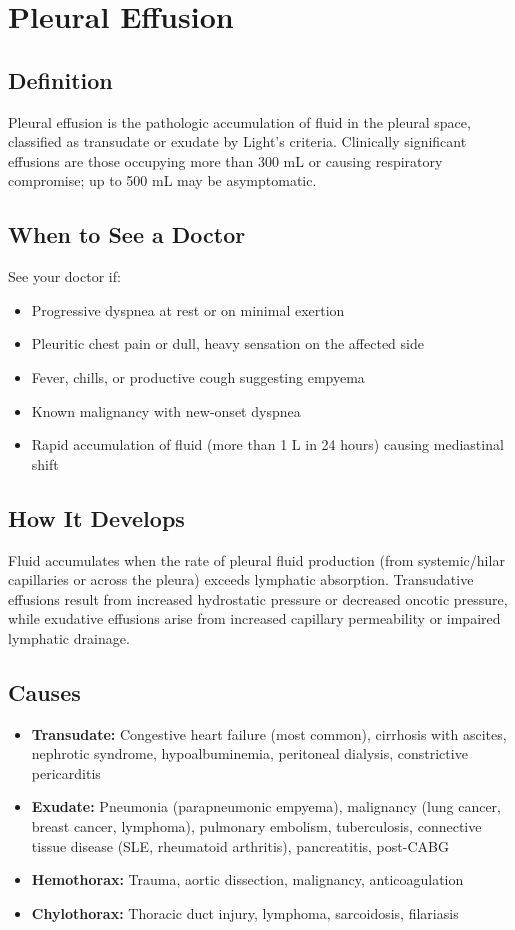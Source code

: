\chapter{Pleural Effusion}

\section*{Definition}
Pleural effusion is the pathologic accumulation of fluid in the pleural space, classified as transudate or exudate by Light's criteria. Clinically significant effusions are those occupying more than 300 mL or causing respiratory compromise; up to 500 mL may be asymptomatic.

\section*{When to See a Doctor}
See your doctor if:
\begin{itemize}
  \item Progressive dyspnea at rest or on minimal exertion
  \item Pleuritic chest pain or dull, heavy sensation on the affected side
  \item Fever, chills, or productive cough suggesting empyema
  \item Known malignancy with new-onset dyspnea
  \item Rapid accumulation of fluid (more than 1 L in 24 hours) causing mediastinal shift
\end{itemize}

\section*{How It Develops}
Fluid accumulates when the rate of pleural fluid production (from systemic/hilar capillaries or across the pleura) exceeds lymphatic absorption. Transudative effusions result from increased hydrostatic pressure or decreased oncotic pressure, while exudative effusions arise from increased capillary permeability or impaired lymphatic drainage.

\section*{Causes}
\begin{itemize}
  \item \textbf{Transudate:} Congestive heart failure (most common), cirrhosis with ascites, nephrotic syndrome, hypoalbuminemia, peritoneal dialysis, constrictive pericarditis
  \item \textbf{Exudate:} Pneumonia (parapneumonic empyema), malignancy (lung cancer, breast cancer, lymphoma), pulmonary embolism, tuberculosis, connective tissue disease (SLE, rheumatoid arthritis), pancreatitis, post-CABG
  \item \textbf{Hemothorax:} Trauma, aortic dissection, malignancy, anticoagulation
  \item \textbf{Chylothorax:} Thoracic duct injury, lymphoma, sarcoidosis, filariasis
\end{itemize}

